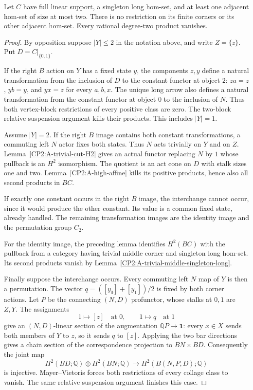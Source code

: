 \begin{theorem}
\label{CP2:A-linear-singleton-long-binary-any-corners}
Let $C$ have full linear support, a singleton long hom-set,
and at least one adjacent hom-set of size at most two.
There is no restriction on its finite corners or its other
adjacent hom-set.  Every rational degree-two product vanishes.
\end{theorem}
\begin{proof}
By opposition suppose $|Y|\leq2$ in the notation above,
and write $Z=\{z\}$.  Put $D=C|_{\{0,1\}}$.

If the right $B$ action on $Y$ has a fixed state $y$, the
components $z,y$ define a natural transformation from the
inclusion of $D$ to the constant functor at object $2$:
$za=z$, $yb=y$, and $yx=z$ for every $a,b,x$.  The unique
long arrow also defines a natural transformation from the
constant functor at object $0$ to the inclusion of $N$.
Thus both vertex-block restrictions of every positive class
are zero.  The two-block relative suspension argument kills
their products.  This includes $|Y|=1$.

Assume $|Y|=2$.  If the right $B$ image contains both
constant transformations, a commuting left $N$ actor fixes
both states.  Thus $N$ acts trivially on $Y$ and on $Z$.
Lemma~\ref{CP2:A-trivial-cut-H2} gives an actual functor
replacing $N$ by $1$ whose pullback is an $H^2$ isomorphism.
The quotient is an act cone on $D$ with stalk sizes one and
two.  Lemma~\ref{CP2:A-high-affine} kills its positive
products, hence also all second products in $BC$.

If exactly one constant occurs in the right $B$ image,
the interchange cannot occur, since it would produce the
other constant.  Its value is a common fixed state, already
handled.  The remaining transformation images are the
identity image and the permutation group $C_2$.

For the identity image, the preceding lemma identifies
$H^2(BC)$ with the pullback from a category having trivial
middle corner and singleton long hom-set.  Its second
products vanish by
Lemma~\ref{CP2:A-trivial-middle-singleton-long}.

Finally suppose the interchange occurs.  Every commuting
left $N$ map of $Y$ is then a permutation.  The vector
$q=([y_0]+[y_1])/2$ is fixed by both corner actions.
Let $P$ be the connecting $(N,D)$ profunctor, whose stalks
at $0,1$ are $Z,Y$.  The assignments
\[
 1\longmapsto[z]\quad\text{at }0,
 \qquad 1\longmapsto q\quad\text{at }1
\]
give an $(N,D)$-linear section of the augmentation
$\mathbb QP\to\mathbf1$: every $x\in X$ sends both
members of $Y$ to $z$, so it sends $q$ to $[z]$.
Applying the two bar directions gives a chain section of
the correspondence projection to $BN\times BD$.
Consequently the joint map
\[
 H^2(BD;\mathbb Q)\oplus H^2(BN;\mathbb Q)
 \longrightarrow H^2(B(N,P,D);\mathbb Q)
\]
is injective.  Mayer--Vietoris forces both restrictions
of every collage class to vanish.  The same relative
suspension argument finishes this case.
\end{proof}

